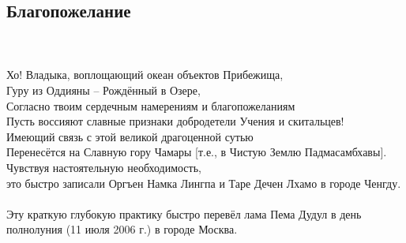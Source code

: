 \subsection*{Благопожелание}\\

\\
Хо! Владыка, воплощающий океан объектов Прибежища,\\
Гуру из Оддияны – Рождённый в Озере,\\
Согласно твоим сердечным намерениям и благопожеланиям\\
Пусть воссияют славные признаки добродетели Учения и скитальцев!\\

\scriptsize
Имеющий связь с этой великой драгоценной сутью\\
Перенесётся на Славную гору Чамары [т.е., в Чистую Землю Падмасамбхавы].\\
Чувствуя настоятельную необходимость,\\
это быстро записали Оргъен Намка Лингпа и Таре Дечен Лхамо в городе Ченгду.\\
\\
Эту краткую глубокую практику быстро перевёл лама Пема Дудул
в день полнолуния (11 июля 2006 г.) в городе Москва.\\
